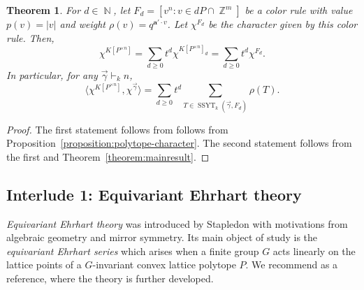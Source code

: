 \documentclass[a4paper,12pt]{amsart}
\theoremstyle{plain}
\newtheorem{theorem}{Theorem}[section]
\theoremstyle{definition}
\theoremstyle{remark}
\DeclareMathOperator{\NN}{\mathbb{N}}
\DeclareMathOperator{\ZZ}{\mathbb{Z}}
\DeclareMathOperator{\SSYT}{SSYT}
\begin{document}
\begin{theorem}\label{thm:projectivecharacter}
    For $d \in \NN$, let $F_d = [ v^n: v \in dP \cap \ZZ^m]$ be a color rule with value $p(v) = |v|$ and weight $\rho(v) = q^{\bm{a}' \cdot v}$. Let $\chi^{F_d}$ be the character given by this color rule. Then,
    \[
    \chi^{K[P^{\times n}]} = \sum_{d \geq 0} t^d \chi^{K[P^{\times n}]_d} = \sum_{d \geq 0} t^d \chi^{F_d}.
    \]
    In particular, for any $\vec{\gamma} \vdash_k n$,
    \[
    \langle \chi^{K[P^{\times n}]} , \chi^{\vec{\gamma}} \rangle
    = \sum_{d \geq 0} t^d \sum_{T \in \SSYT_k(\vec{\gamma},F_d)} \rho(T).
    \]
\end{theorem}

\begin{proof}
    The first statement follows from  follows from Proposition~\ref{proposition:polytope-character}. The second statement follows from the first and Theorem~\ref{theorem:mainresult}.
\end{proof}

\subsection{Interlude 1: Equivariant Ehrhart theory}\label{subsection:equivariant-ehrhart-theory}

\emph{Equivariant Ehrhart theory} was introduced by Stapledon \cite{stapledon-equivariant} with motivations from algebraic geometry and mirror symmetry. Its main object of study is the \emph{equivariant Ehrhart series} which arises when a finite group $G$ acts linearly on the lattice points of a $G$-invariant convex lattice polytope $P$. We recommend \cite{elia-kim-supina-techniques} as a reference, where the theory is further developed. \\
\end{document}
